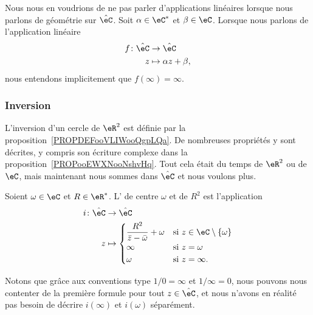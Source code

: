 Nous nous en voudrions de ne pas parler d'applications linéaires lorsque nous parlons de géométrie sur \( \hat \eC\). Soit \( \alpha\in \eC^*\) et \( \beta\in \eC\). Lorsque nous parlons de l'application linéaire
\begin{equation}
    \begin{aligned}
        f\colon \hat\eC&\to \hat\eC \\
        z&\mapsto \alpha z+\beta,
    \end{aligned}
\end{equation}
nous entendons implicitement que \( f(\infty)=\infty\).

\subsubsection{Inversion}
\label{SSUBSooPOUNooTPilbE}

L'inversion d'un cercle de \( \eR^2\) est définie par la proposition~\ref{PROPDEFooVLIWooQgpLQa}. De nombreuses propriétés y sont décrites, y compris son écriture complexe dans la proposition~\ref{PROPooEWXNooNshvHq}. Tout cela était du temps de \( \eR^2\) ou de \( \eC\), mais maintenant nous sommes dans \( \hat \eC\) et nous voulons plus.

\begin{definition}       \label{DEFooIUTZooWRaXts}
    Soient \( \omega\in \eC\) et \( R\in \eR^*\). L' de centre \( \omega\) et de  \( R^2\) est l'application
    \begin{equation}
        \begin{aligned}
            i\colon \hat \eC&\to \hat \eC \\
            z&\mapsto \begin{cases}
                \dfrac{ R^2 }{ \bar z-\bar \omega }+\omega    &   \text{si } z\in \eC\setminus\{ \omega \}\\
                 \infty   &    \text{si } z=\omega\\
                 \omega   &    \text{si } z=\infty.
            \end{cases}
        \end{aligned}
    \end{equation}
\end{definition}
Notons que grâce aux conventions type \( 1/0=\infty\) et \( 1/\infty=0\), nous pouvons nous contenter de la première formule pour tout \( z\in \hat \eC\), et nous n'avons en réalité pas besoin de décrire \( i(\infty)\) et \( i(\omega)\) séparément.

